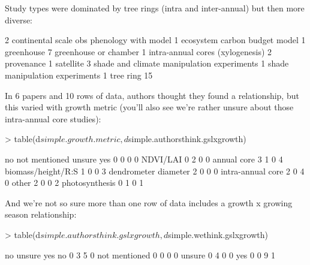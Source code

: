 \documentclass[11pt]{article}
\begin{document}
\newpage
Study types were dominated by tree rings (intra and inter-annual) but then more diverse:
\begin{Schunk}
\begin{Soutput}
                                         2 
continental scale obs phenology with model 
                                         1 
             ecosystem carbon budget model 
                                         1 
                                greenhouse 
                                         7 
                     greenhouse or chamber 
                                         1 
          intra-annual cores (xylogenesis) 
                                         2 
                                provenance 
                                         1 
                                 satellite 
                                         3 
shade and climate manipulation experiments 
                                         1 
            shade manipulation experiments 
                                         1 
                                 tree ring 
                                        15 
\end{Soutput}
\end{Schunk}
\newpage

In 6 papers and 10 rows of data, authors thought they found a relationship, but this varied with growth metric (you'll also see we're rather unsure about those intra-annual core studies):
\begin{Schunk}
\begin{Sinput}
> table(d$simple.growth.metric, d$simple.authorsthink.gslxgrowth)
\end{Sinput}
\begin{Soutput}
                       no not mentioned unsure yes
                        0             0      0   0
  NDVI/LAI              0             2      0   0
  annual core           3             1      0   4
  biomass/height/R:S    1             0      0   3
  dendrometer diameter  2             0      0   0
  intra-annual core     2             0      4   0
  other                 2             0      0   2
  photosynthesis        0             1      0   1
\end{Soutput}
\end{Schunk}


And we're not so sure more than one row of data includes a growth x growing season relationship:
\begin{Schunk}
\begin{Sinput}
> table(d$simple.authorsthink.gslxgrowth, d$simple.wethink.gslxgrowth)
\end{Sinput}
\begin{Soutput}
                  no unsure yes
  no            0  3      5   0
  not mentioned 0  0      0   0
  unsure        0  4      0   0
  yes           0  0      9   1
\end{Soutput}
\end{Schunk}
\end{document}
